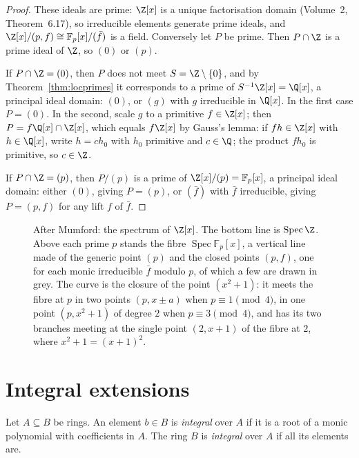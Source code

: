 \begin{proof}
These ideals are prime: $\Z[x]$ is a unique factorisation domain (Volume~2, Theorem~6.17), so irreducible elements generate prime ideals, and $\Z[x]/(p,f)\cong\mathbb F_p[x]/(\bar f)$ is a field. Conversely let $P$ be prime. Then
$P\cap\Z$ is a prime ideal of $\Z$, so $(0)$ or $(p)$.

If $P\cap\Z=(0)$, then $P$ does not meet $S=\Z\setminus\{0\}$, and by Theorem~\ref{thm:locprimes} it corresponds to a prime of $S^{-1}\Z[x]=\Q[x]$, a principal ideal domain: $(0)$, or $(g)$ with $g$ irreducible in $\Q[x]$. In the
first case $P=(0)$. In the second, scale $g$ to a primitive $f\in\Z[x]$; then $P=f\Q[x]\cap\Z[x]$, which equals $f\Z[x]$ by Gauss's lemma: if $fh\in\Z[x]$ with $h\in\Q[x]$, write $h=ch_0$ with $h_0$ primitive and $c\in\Q$; the
product $fh_0$ is primitive, so $c\in\Z$.

If $P\cap\Z=(p)$, then $P/(p)$ is a prime of $\Z[x]/(p)=\mathbb F_p[x]$, a principal ideal domain: either $(0)$, giving $P=(p)$, or $(\bar f)$ with $\bar f$ irreducible, giving $P=(p,f)$ for any lift $f$ of $\bar f$.
\end{proof}

\begin{figure}[ht]
\centering
{}
\caption{After Mumford: the spectrum of $\Z[x]$. The bottom line is $\operatorname{Spec}\Z$. Above each prime $p$ stands the fibre $\operatorname{Spec}\mathbb F_p[x]$, a vertical line made of the generic point $(p)$ and the
closed points $(p,f)$, one for each monic irreducible $\bar f$ modulo $p$, of which a few are drawn in grey. The curve is the closure of the point $(x^2+1)$: it meets the fibre at $p$ in two points
$(p,x\pm a)$ when $p\equiv1\pmod4$, in one point $(p,x^2+1)$ of degree $2$ when $p\equiv3\pmod4$, and has its two branches meeting at the single point $(2,x+1)$ of the fibre at $2$, where $x^2+1=(x+1)^2$.}
\label{fig:specz}
\end{figure}

\section{Integral extensions}

\begin{definition}\label{def:integral}
Let $A\subseteq B$ be rings. An element $b\in B$ is \emph{integral} over $A$ if it is a root of a monic polynomial with coefficients in $A$. The ring $B$ is \emph{integral} over $A$ if all its elements are.
\end{definition}

